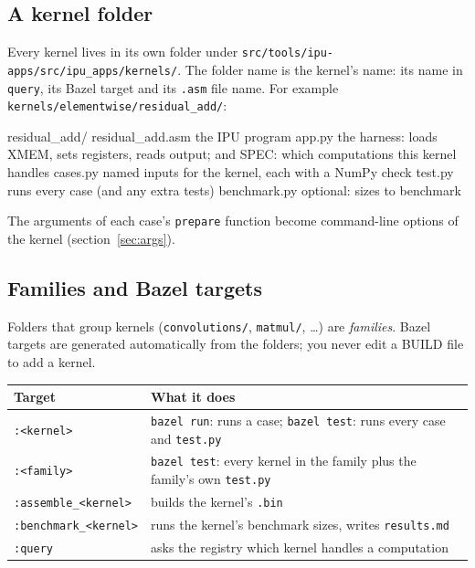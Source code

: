 \documentclass[11pt,a4paper]{article}
\begin{document}
\subsection{A kernel folder}

Every kernel lives in its own folder under
\texttt{src/tools/ipu-apps/src/ipu\_apps/kernels/}. The folder name is the
kernel's name: its name in \texttt{query}, its Bazel target and its
\texttt{.asm} file name. For example \texttt{kernels/elementwise/residual\_add/}:

\begin{filetree}
residual_add/
  residual_add.asm   the IPU program
  app.py             the harness: loads XMEM, sets registers, reads output;
                     and SPEC: which computations this kernel handles
  cases.py           named inputs for the kernel, each with a NumPy check
  test.py            runs every case (and any extra tests)
  benchmark.py       optional: sizes to benchmark
\end{filetree}

The arguments of each case's \texttt{prepare} function become command-line
options of the kernel (section~\ref{sec:args}).

\subsection{Families and Bazel targets}

Folders that group kernels (\texttt{convolutions/}, \texttt{matmul/},
\ldots) are \emph{families}. Bazel targets are generated automatically from the
folders; you never edit a BUILD file to add a kernel.

\begin{center}
\begin{tabularx}{\linewidth}{lX}
\toprule
Target & What it does \\
\midrule
\texttt{:<kernel>} & \texttt{bazel run}: runs a case; \texttt{bazel test}: runs every case and \texttt{test.py} \\
\texttt{:<family>} & \texttt{bazel test}: every kernel in the family plus the family's own \texttt{test.py} \\
\texttt{:assemble\_<kernel>} & builds the kernel's \texttt{.bin} \\
\texttt{:benchmark\_<kernel>} & runs the kernel's benchmark sizes, writes \texttt{results.md} \\
\texttt{:query} & asks the registry which kernel handles a computation \\
\bottomrule
\end{tabularx}
\end{center}
\end{document}
